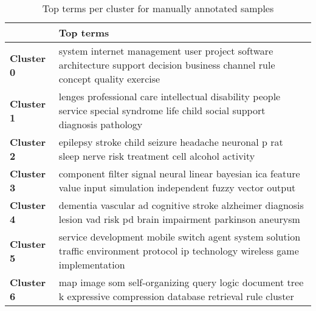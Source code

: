 \begin{table}
\begin{tabular}{|p{2cm}|p{10.5cm}|} 
\hline %
\textbf{ } & \textbf{Top terms} \\ 
\hline 
\textbf{Cluster 0} & system internet management user project software architecture support decision business channel rule concept quality exercise  \\ 
\hline
\hline 
\textbf{Cluster 1} & lenges professional care intellectual disability people service special syndrome life child social support diagnosis pathology  \\ 
\hline
\hline 
\textbf{Cluster 2} & epilepsy stroke child seizure headache neuronal p rat sleep nerve risk treatment cell alcohol activity  \\ 
\hline
\hline 
\textbf{Cluster 3} & component filter signal neural linear bayesian ica feature value input simulation independent fuzzy vector output \\ 
\hline
\hline 
\textbf{Cluster 4} & dementia vascular ad cognitive stroke alzheimer diagnosis lesion vad risk pd brain impairment parkinson aneurysm \\ 
\hline
\hline 
\textbf{Cluster 5} & service development mobile switch agent system solution traffic environment protocol ip technology wireless game implementation \\ 
\hline
\hline 
\textbf{Cluster 6} & map image som self-organizing query logic document tree k expressive compression database retrieval rule cluster \\ 
\hline
\end{tabular} %
\caption{Top terms per cluster for manually annotated samples}
\label{table:topterms}
\end{table} %
